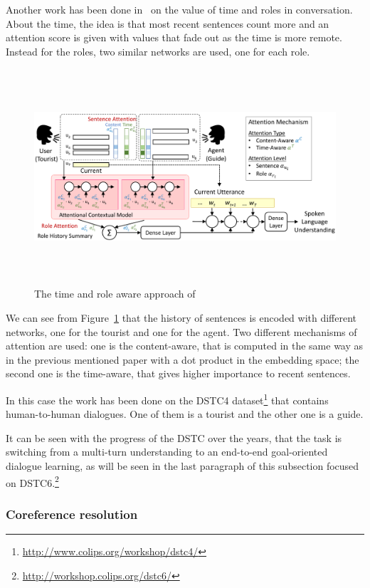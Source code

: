 Another work has been done in~\cite{chen2017dynamic} on the value of time and roles in conversation. About the time, the idea is that most recent sentences count more and an attention score is given with values that fade out as the time is more remote. Instead for the roles, two similar networks are used, one for each role.

\begin{figure}[!htbp]
    \centering
    \includegraphics[max width=\linewidth,max height=8cm,keepaspectratio]{figures/timeRoleSLUchen}
    \caption{The time and role aware approach of~\cite{chen2017dynamic}}\label{fig:timeRoleSLUchen}
\end{figure}

We can see from Figure~\ref{fig:timeRoleSLUchen} that the history of sentences is encoded with different networks, one for the tourist and one for the agent. Two different mechanisms of attention are used: one is the content-aware, that is computed in the same way as in the previous mentioned paper with a dot product in the embedding space; the second one is the time-aware, that gives higher importance to recent sentences.

In this case the work has been done on the DSTC4 dataset\footnote{\url{http://www.colips.org/workshop/dstc4/}} that contains human-to-human dialogues. One of them is a tourist and the other one is a guide.

It can be seen with the progress of the DSTC over the years, that the task is switching from a multi-turn understanding to an end-to-end goal-oriented dialogue learning, as will be seen in the last paragraph of this subsection focused on DSTC6.\footnote{\url{http://workshop.colips.org/dstc6/}}

\subsubsection{Coreference resolution}
\label{soaCoreference}

